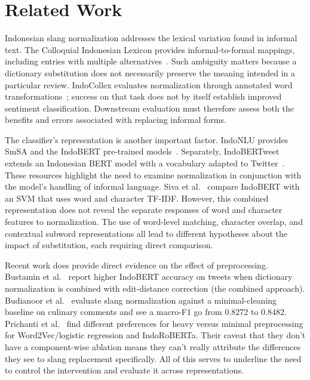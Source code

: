 \section{Related Work}
Indonesian slang normalization addresses the lexical variation found in informal text. The Colloquial Indonesian Lexicon provides informal-to-formal mappings, including entries with multiple alternatives~\cite{salsabila2018}. Such ambiguity matters because a dictionary substitution does not necessarily preserve the meaning intended in a particular review. IndoCollex evaluates normalization through annotated word transformations~\cite{wibowo2021}; success on that task does not by itself establish improved sentiment classification. Downstream evaluation must therefore assess both the benefits and errors associated with replacing informal forms.

The classifier's representation is another important factor. IndoNLU provides SmSA and the IndoBERT pre-trained models~\cite{wilie2020}. Separately, IndoBERTweet extends an Indonesian BERT model with a vocabulary adapted to Twitter~\cite{koto2021}. These resources highlight the need to examine normalization in conjunction with the model's handling of informal language. Siva et al.~\cite{siva2026} compare IndoBERT with an SVM that uses word and character TF-IDF. However, this combined representation does not reveal the separate responses of word and character features to normalization. The use of word-level matching, character overlap, and contextual subword representations all lead to different hypotheses about the impact of substitution, each requiring direct comparison.

Recent work does provide direct evidence on the effect of preprocessing. Bustamin et al.~\cite{bustamin2025} report higher IndoBERT accuracy on tweets when dictionary normalization is combined with edit-distance correction (the combined approach). Budianoor et al.~\cite{budianoor2026} evaluate slang normalization against a minimal-cleaning baseline on culinary comments and see a macro-F1 go from 0.8272 to 0.8482. Prichanti et al.~\cite{prichanti2026} find different preferences for heavy versus minimal preprocessing for Word2Vec/logistic regression and IndoRoBERTa. Their caveat that they don't have a component-wise ablation means they can't really attribute the differences they see to slang replacement specifically. All of this serves to underline the need to control the intervention and evaluate it across representations.

